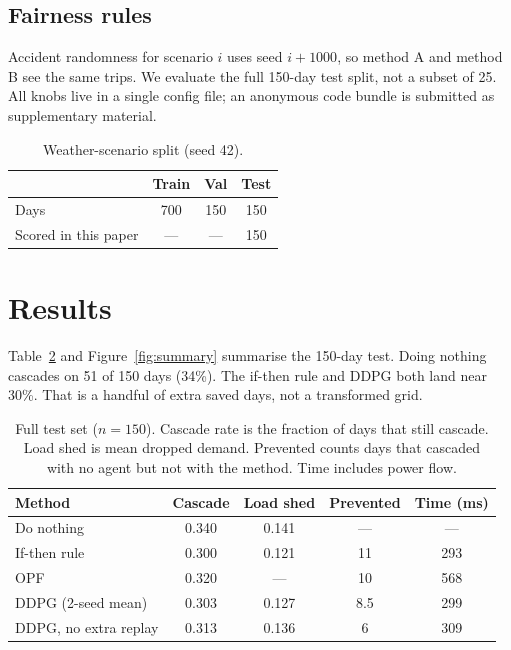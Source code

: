 \documentclass[11pt,a4paper]{article}
\begin{document}
\subsection{Fairness rules}
Accident randomness for scenario $i$ uses seed $i+1000$, so method A and method B see the same trips.
We evaluate the full 150-day test split, not a subset of 25.
All knobs live in a single config file; an anonymous code bundle is submitted as supplementary material.

\begin{table}[t]
\centering
\caption{Weather-scenario split (seed 42).}
\label{tab:dataset}
\begin{tabular}{lccc}
\toprule
 & Train & Val & Test \\
\midrule
Days & 700 & 150 & 150 \\
Scored in this paper & --- & --- & 150 \\
\bottomrule
\end{tabular}
\end{table}

\section{Results}

Table~\ref{tab:main} and Figure~\ref{fig:summary} summarise the 150-day test.
Doing nothing cascades on 51 of 150 days (34\%).
The if-then rule and DDPG both land near 30\%.
That is a handful of extra saved days, not a transformed grid.

\begin{table}[t]
\centering
\caption{Full test set ($n=150$). Cascade rate is the fraction of days that still cascade. Load shed is mean dropped demand. Prevented counts days that cascaded with no agent but not with the method. Time includes power flow.}
\label{tab:main}
\begin{tabular}{lcccc}
\toprule
Method & Cascade & Load shed & Prevented & Time (ms) \\
\midrule
Do nothing     & 0.340 & 0.141 & --- & --- \\
If-then rule   & 0.300 & 0.121 & 11  & 293 \\
OPF            & 0.320 & ---   & 10  & 568 \\
DDPG (2-seed mean) & 0.303 & 0.127 & 8.5 & 299 \\
DDPG, no extra replay  & 0.313 & 0.136 & 6   & 309 \\
\bottomrule
\end{tabular}
\end{table}
\end{document}
